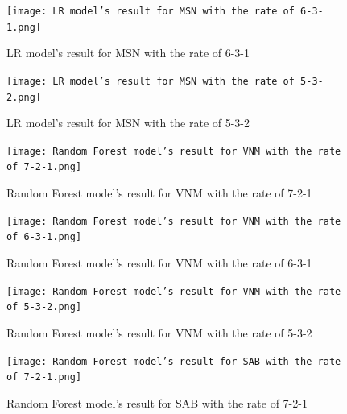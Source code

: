 \documentclass{ieeeojies}
\begin{document}
    \begin{figure}[H]
    \centering
    \begin{minipage}{0.23\textwidth}
    \centering
    \texttt{[image: LR model’s result for MSN with the rate of 6-3-1.png]}
    \caption{LR model’s result for MSN with the rate of 6-3-1}
    \end{minipage}
    \hfill
    \begin{minipage}{0.23\textwidth}
    \centering
    \texttt{[image: LR model’s result for MSN with the rate of 5-3-2.png]}
    \caption{LR model’s result for MSN with the rate of 5-3-2}
    \end{minipage}
     \end{figure}
  \begin{figure}[H]
    \centering
    \begin{minipage}{0.23\textwidth}
    \centering
    \texttt{[image: Random Forest model’s result for VNM with the rate of 7-2-1.png]}
    \caption{Random Forest model’s result for VNM with the rate of 7-2-1}
    \end{minipage}
    \hfill
    \begin{minipage}{0.23\textwidth}
    \centering
    \texttt{[image: Random Forest model’s result for VNM with the rate of 6-3-1.png]}
    \caption{Random Forest model’s result for VNM with the rate of 6-3-1}
    \end{minipage}

    \begin{minipage}{0.23\textwidth}
    \centering
    \texttt{[image: Random Forest model’s result for VNM with the rate of 5-3-2.png]}
    \caption{Random Forest model’s result for VNM with the rate of 5-3-2}
    \end{minipage}
    \hfill
    \begin{minipage}{0.23\textwidth}
    \centering
    \texttt{[image: Random Forest model’s result for SAB with the rate of 7-2-1.png]}
    \caption{Random Forest model’s result for SAB with the rate of 7-2-1}
    \end{minipage}
   \end{figure}
\end{document}
